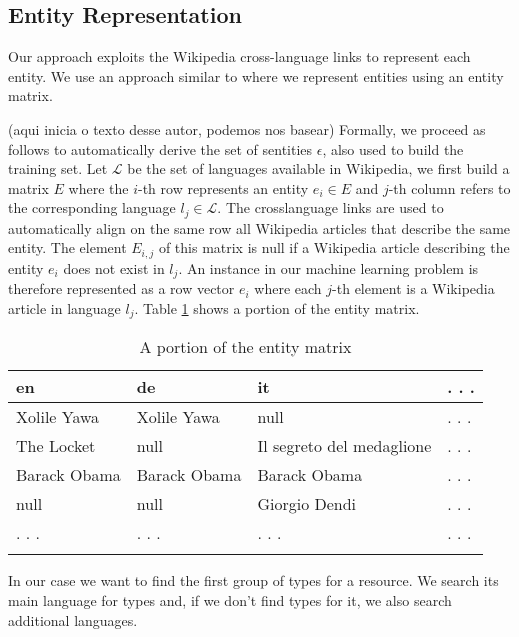 \documentclass[10pt,a4paper]{llncs}
\begin{document}
\subsection{Entity Representation}

Our approach exploits the Wikipedia cross-language links to represent each entity. We use an approach similar to \cite{aprosio} where we represent entities using an entity matrix. 

(aqui inicia o texto desse autor, podemos nos basear)
Formally, we proceed as follows to automatically derive the set of sentities $\epsilon$, also used to build the training set. Let $\mathcal{L}$ be the set of languages available in Wikipedia, we first build a matrix $E$ where the $i$-th row represents an entity $e_i \in E$ and $j$-th column refers to the corresponding language $l_j \in \mathcal{L}$. The crosslanguage links are used to automatically align on the same row all Wikipedia articles that describe the same entity. The element $E_{i,j}$ of this matrix is null if a Wikipedia article describing the entity $e_i$ does not exist in $l_j$. An instance in our machine learning problem is therefore represented as a row vector $e_i$ where each $j$-th element is a Wikipedia article in language $l_j$. Table \ref{tab:entityMatrix} shows a portion of the entity matrix.

\begin{table}
\centering
    \begin{tabular}{llll}
    en           & de           & it                        & . . .  \\ \hline
    Xolile Yawa  & Xolile Yawa  & null                      &  . . . \\
    The Locket   & null         & Il segreto del medaglione & . . .  \\
    Barack Obama & Barack Obama & Barack Obama              & . . .  \\
    null         & null         & Giorgio Dendi             & . . .  \\
    . . .        & . . .        & . . .                     & . . .  \\
    \vspace{0.2cm}
    \end{tabular}
    \caption{A portion of the entity matrix}
	  \label{tab:entityMatrix}
\end{table}

In our case we want to find the first group of types for a resource. We search its main language for types and, if we don't find types for it, we also search additional languages.
\end{document}
